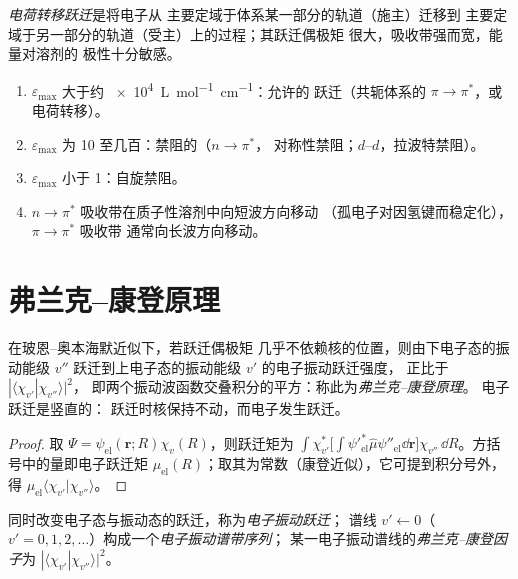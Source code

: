 \begin{definition}[电荷转移跃迁]\label{def:b3:electronic-spectroscopy:charge-transfer}
\emph{电荷转移跃迁}是将电子从
主要定域于体系某一部分的轨道（施主）迁移到
主要定域于另一部分的轨道（受主）上的过程；其跃迁偶极矩
很大，吸收带强而宽，能量对溶剂的
极性十分敏感。
\end{definition}

\begin{method}[吸收带的指认]\label{met:b3:electronic-spectroscopy:assign-band}
\begin{enumerate}
  \item $\varepsilon_{\max}$ 大于约 \qty{e4}{L.mol^{-1}.cm^{-1}}：允许的
        跃迁（共轭体系的 $\pi\to\pi^*$，或电荷转移）。
  \item $\varepsilon_{\max}$ 为 10 至几百：禁阻的（$n\to\pi^*$，
        对称性禁阻；$d$--$d$，拉波特禁阻）。
  \item $\varepsilon_{\max}$ 小于 1：自旋禁阻。
  \item $n\to\pi^*$ 吸收带在质子性溶剂中向短波方向移动
        （孤电子对因氢键而稳定化），$\pi\to\pi^*$ 吸收带
        通常向长波方向移动。
\end{enumerate}
\end{method}

\section{弗兰克–康登原理}

\begin{theorem}\label{thm:b3:electronic-spectroscopy:franck-condon}
在玻恩–奥本海默近似下，若跃迁偶极矩
几乎不依赖核的位置，则由下电子态的振动能级 $v''$
跃迁到上电子态的振动能级 $v'$ 的电子振动跃迁强度，
正比于 $|\langle\chi_{v'}|\chi_{v''}\rangle|^2$，
即两个振动波函数交叠积分的平方：称此为\emph{弗兰克–康登原理}。
电子跃迁是竖直的：
跃迁时核保持不动，而电子发生跃迁。
\end{theorem}

\begin{proof}
取 $\Psi = \psi_{\mathrm{el}}(\mathbf r;R)\chi_v(R)$，则跃迁矩为
$\int\chi_{v'}^*\big[\int\psi'^*_{\mathrm{el}}\hat\mu\psi''_{\mathrm{el}}\dd\mathbf r\big]
\chi_{v''}\,\dd R$。方括号中的量即电子跃迁矩
$\mu_{\mathrm{el}}(R)$；取其为常数（康登近似），它可提到积分号外，
得 $\mu_{\mathrm{el}}\langle\chi_{v'}|\chi_{v''}\rangle$。
\end{proof}

\begin{definition}\label{def:b3:electronic-spectroscopy:vibronic}
同时改变电子态与振动态的跃迁，称为\emph{电子振动跃迁}；
谱线 $v' \leftarrow 0$（$v' = 0, 1, 2,
\dots$）构成一个\emph{电子振动谱带序列}；
某一电子振动谱线的\emph{弗兰克–康登因子}为
$|\langle\chi_{v'}|\chi_{v''}\rangle|^2$。
\end{definition}

